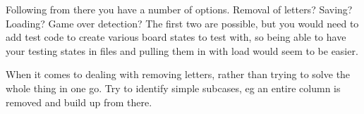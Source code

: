 Following from there you have a number of options.
Removal of letters? Saving? Loading? Game over detection?
The first two are possible, but you would need to add test code to create various board states to test with, so being able 
to have your testing states in files and pulling them in with load would seem to be easier.

When it comes to dealing with removing letters, rather than trying to solve the whole thing in one go.
Try to identify simple subcases, eg an entire column is removed and build up from there.

